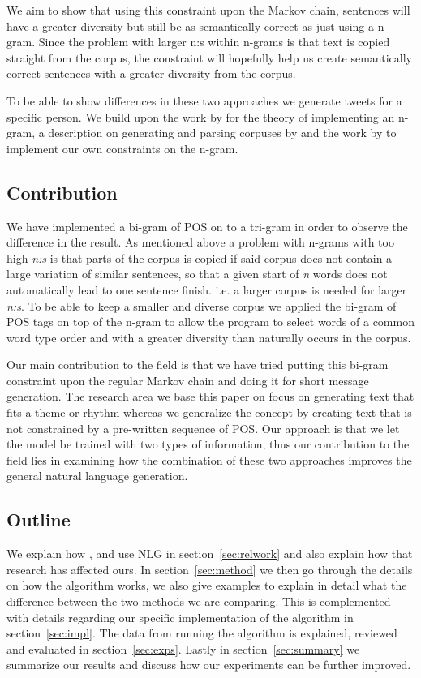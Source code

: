\documentclass[a4paper,12pt]{article}
\begin{document}
We aim to show that using this constraint upon the Markov chain, sentences will have a greater diversity but still be as semantically correct as just using a n-gram.
Since the problem with larger n:s within n-grams is that text is copied straight from the corpus, 
the constraint will hopefully help us create semantically correct sentences with a greater diversity from the corpus.

To be able to show differences in these two approaches we generate tweets for a specific person.
We build upon the work by \cite{shannon48} for the theory of implementing an n-gram, a description on generating and parsing corpuses by \citep{Corpus}
and the work by \citealp{McBarb} to implement our own constraints on the n-gram.
   
\subsection{Contribution}

We have implemented a bi-gram of POS on to a tri-gram in order to observe the difference in the result. 
As mentioned above a problem with n-grams with too high \textit{n:s} is that parts of the corpus is copied if said corpus does not contain a large variation of similar sentences, 
so that a given start of \textit{n} words does not automatically lead to one sentence finish. i.e. a larger corpus is needed for larger \textit{n:s}.
To be able to keep a smaller and diverse corpus we applied the bi-gram of POS tags on top of the n-gram to allow the program to select words of a common word type order and with a greater diversity than naturally occurs in the corpus.

Our main contribution to the field is that we have tried putting this bi-gram constraint upon the regular Markov chain and doing it for short message generation.
The research area we base this paper on focus on generating text that fits a theme or rhythm whereas we generalize the concept by creating text that is not constrained by a pre-written sequence of POS. 
Our approach is that we let the model be trained with two types of information, thus our contribution to the field lies in examining how the combination of these two approaches improves the general natural language generation.

\subsection{Outline}
We explain how \citep{shannon48}, \citep{Corpus} and \cite{McBarb} use NLG in section~\ref{sec:relwork} and also explain how that research has affected ours. 
In section~\ref{sec:method} we then go through the details on how the algorithm works, 
we also give examples to explain in detail what the difference between the two methods we are comparing. 
This is complemented with details regarding our specific implementation of the algorithm in section~\ref{sec:impl}. 
The data from running the algorithm is explained, reviewed and evaluated in section~\ref{sec:exps}. Lastly in section~\ref{sec:summary} we summarize our results and discuss how our experiments can be further improved.
\end{document}
